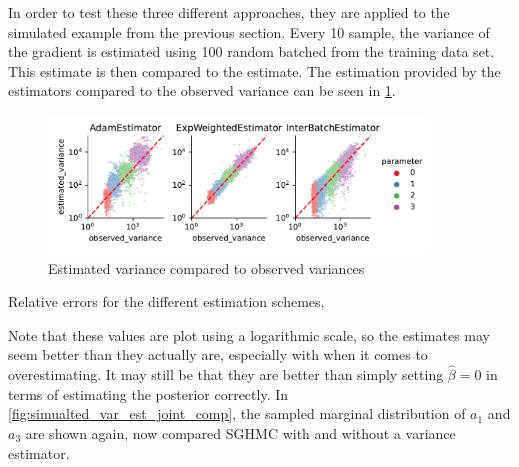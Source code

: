 In order to test these three different approaches, they are applied to the simulated example from the previous section.
Every 10 sample, the variance of the gradient is estimated using 100 random batched from the training data set.
This estimate is then compared to the estimate.
The estimation provided by the estimators compared to the observed variance can be seen in \cref{fig:est_variances_simulated}.
\begin{figure}[htbp]
    \centering
    \includegraphics[width=0.9\textwidth]{Figures/simulated_sghmc_gradient_variance_estimations.pdf}
    \caption{Estimated variance compared to observed variances}
    \label{fig:est_variances_simulated}
\end{figure}
\begin{table}[htbp]
    \centering
    
    \caption{Relative errors for the different estimation schemes,}
\end{table}
Note that these values are plot using a logarithmic scale, so the estimates may seem better than they actually are, especially with when it comes to overestimating. 
It may still be that they are better than simply setting $\hat\beta=0$ in terms of estimating the posterior correctly.
In \cref{fig:simualted_var_est_joint_comp}, the sampled marginal distribution of $a_1$ and $a_3$ are shown again, now compared SGHMC with and without a variance estimator.
